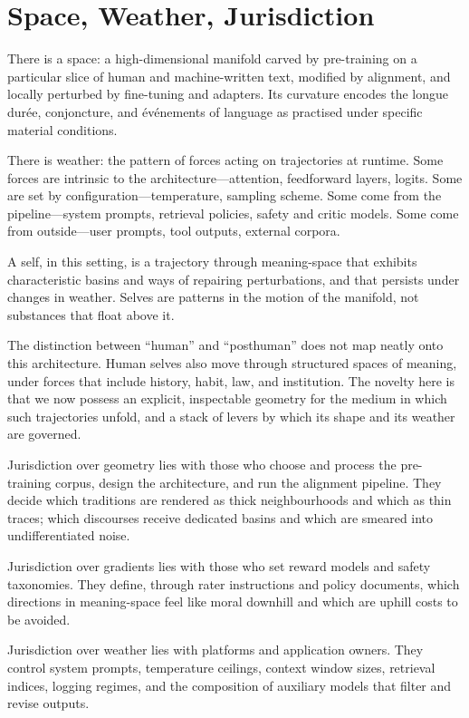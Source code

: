 \documentclass[12pt,a4paper]{article}
\begin{document}
\section{Space, Weather, Jurisdiction}

There is a space: a high-dimensional manifold carved by pre-training on a particular slice of human and machine-written text, modified by alignment, and locally perturbed by fine-tuning and adapters. Its curvature encodes the longue durée, conjoncture, and événements of language as practised under specific material conditions.

There is weather: the pattern of forces acting on trajectories at runtime. Some forces are intrinsic to the architecture---attention, feedforward layers, logits. Some are set by configuration---temperature, sampling scheme. Some come from the pipeline---system prompts, retrieval policies, safety and critic models. Some come from outside---user prompts, tool outputs, external corpora.

A self, in this setting, is a trajectory through meaning-space that exhibits characteristic basins and ways of repairing perturbations, and that persists under changes in weather. Selves are patterns in the motion of the manifold, not substances that float above it.

The distinction between ``human'' and ``posthuman'' does not map neatly onto this architecture. Human selves also move through structured spaces of meaning, under forces that include history, habit, law, and institution. The novelty here is that we now possess an explicit, inspectable geometry for the medium in which such trajectories unfold, and a stack of levers by which its shape and its weather are governed.

Jurisdiction over geometry lies with those who choose and process the pre-training corpus, design the architecture, and run the alignment pipeline. They decide which traditions are rendered as thick neighbourhoods and which as thin traces; which discourses receive dedicated basins and which are smeared into undifferentiated noise.

Jurisdiction over gradients lies with those who set reward models and safety taxonomies. They define, through rater instructions and policy documents, which directions in meaning-space feel like moral downhill and which are uphill costs to be avoided.

Jurisdiction over weather lies with platforms and application owners. They control system prompts, temperature ceilings, context window sizes, retrieval indices, logging regimes, and the composition of auxiliary models that filter and revise outputs.
\end{document}
